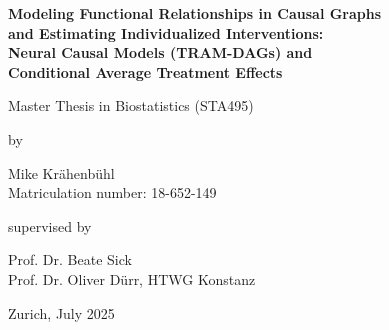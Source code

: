 \renewcommand\familydefault{\sfdefault} 


\thispagestyle{empty}
\renewcommand{\baselinestretch}{1.5}\normalfont
\begin{center}
\setlength{\parindent}{0cm}
\bf\Large%
Modeling Functional Relationships in Causal Graphs \\
and Estimating Individualized Interventions: \\
Neural Causal Models (TRAM-DAGs) and \\
Conditional Average Treatment Effects

\normalfont



\hrulefill

\vspace*{4cm}

\large
Master Thesis in Biostatistics (STA495) %
\vspace*{12mm}

by

\vspace*{12mm}

Mike Kr{\"a}henb{\"u}hl\\
\small Matriculation number: 18-652-149\\
\normalfont
\vspace*{4cm}

supervised by

\vspace*{1cm}

Prof. Dr. Beate Sick \\
Prof. Dr. Oliver D{\"u}rr, HTWG Konstanz
\vfill

Zurich, July 2025
\end{center}
\renewcommand\familydefault{\rmdefault}%
\renewcommand{\baselinestretch}{1.0}\rm 
\setcounter{page}{0}
\newpage
\vspace*{12cm}~\thispagestyle{empty}
\newpage
